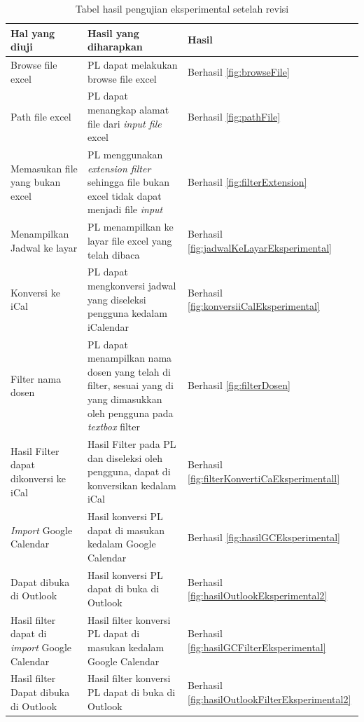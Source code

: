 \begin{table}[H]
	\centering
		\caption{Tabel hasil pengujian eksperimental setelah revisi}
		\label{tab:eksperimental}
		\begin{tabular}{ | p{4cm} | p{4cm} | p{4cm} | }
			\hline
				Hal yang diuji & Hasil yang diharapkan & Hasil \\ \hline
				Browse file excel & PL dapat melakukan browse file excel & Berhasil \ref{fig:browseFile}\\ \hline
				Path file excel & PL dapat menangkap alamat file dari \textit{input file} excel & Berhasil \ref{fig:pathFile} \\ \hline
				Memasukan file yang bukan excel & PL menggunakan \textit{extension filter} sehingga file bukan excel tidak dapat menjadi file \textit{input} & Berhasil \ref{fig:filterExtension} \\ \hline
				Menampilkan Jadwal ke layar & PL menampilkan ke layar file excel yang telah dibaca & Berhasil \ref{fig:jadwalKeLayarEksperimental} \\ \hline
				Konversi ke iCal & PL dapat mengkonversi jadwal yang diseleksi pengguna kedalam iCalendar & Berhasil \ref{fig:konversiiCalEksperimental} \\ \hline
				Filter nama dosen & PL dapat menampilkan nama dosen yang telah di filter, sesuai yang di yang dimasukkan oleh pengguna pada \textit{textbox} filter & Berhasil \ref{fig:filterDosen} \\ \hline
				Hasil Filter dapat dikonversi ke iCal & Hasil Filter pada PL dan diseleksi oleh pengguna, dapat di konversikan kedalam iCal & Berhasil \ref{fig:filterKonvertiCaEksperimentall} \\ \hline
				\textit{Import} Google Calendar & Hasil konversi PL dapat di masukan kedalam Google Calendar & Berhasil \ref{fig:hasilGCEksperimental} \\ \hline
				Dapat dibuka di Outlook & Hasil konversi PL dapat di buka di Outlook & Berhasil  \ref{fig:hasilOutlookEksperimental2}\\ \hline
				Hasil filter dapat di \textit{import} Google Calendar & Hasil filter konversi PL dapat di masukan kedalam Google Calendar & Berhasil \ref{fig:hasilGCFilterEksperimental} \\ \hline
				Hasil filter Dapat dibuka di Outlook & Hasil filter konversi PL dapat di buka di Outlook & Berhasil \ref{fig:hasilOutlookFilterEksperimental2} \\ \hline
		\end{tabular}
\end{table}

